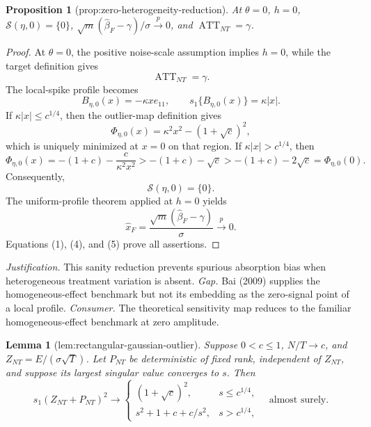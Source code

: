 \documentclass{article}
\newtheorem{lemma}{Lemma}
\newtheorem{proposition}{Proposition}
\begin{document}
\begin{proposition}[prop:zero-heterogeneity-reduction]\label{prop:zero-heterogeneity-reduction}
At \(\theta=0\), \(h=0\), \(\mathcal S(\eta,0)=\{0\}\), \(\sqrt m(\widehat\beta_F-\gamma)/\sigma\xrightarrow{p}0\), and \(\operatorname{ATT}_{NT}=\gamma\).
\end{proposition}
\begin{proof}
At \(\theta=0\), the positive noise-scale assumption implies \(h=0\), while the target definition gives
\[
 \operatorname{ATT}_{NT}=\gamma. \tag{1}
\]
The local-spike profile becomes
\[
 B_{\eta,0}(x)=-\kappa xe_{11},
 \qquad s_1\{B_{\eta,0}(x)\}=\kappa|x|. \tag{2}
\]
If \(\kappa|x|\leq c^{1/4}\), then the outlier-map definition gives
\[
 \Phi_{\eta,0}(x)=\kappa^2x^2-(1+\sqrt c)^2,
\]
which is uniquely minimized at \(x=0\) on that region.  If \(\kappa|x|>c^{1/4}\), then
\[
 \Phi_{\eta,0}(x)=-(1+c)-\frac{c}{\kappa^2x^2}
 >-(1+c)-\sqrt c
 >-(1+c)-2\sqrt c=\Phi_{\eta,0}(0). \tag{3}
\]
Consequently,
\[
 \mathcal S(\eta,0)=\{0\}. \tag{4}
\]
The uniform-profile theorem applied at \(h=0\) yields
\[
 \widehat x_F=\frac{\sqrt m(\widehat\beta_F-\gamma)}\sigma\xrightarrow{p}0. \tag{5}
\]
Equations (1), (4), and (5) prove all assertions.
\end{proof}
\par\smallskip\noindent \textit{Justification.} This sanity reduction prevents spurious absorption bias when heterogeneous treatment variation is absent. \textit{Gap.} Bai (2009) supplies the homogeneous-effect benchmark but not its embedding as the zero-signal point of a local profile. \textit{Consumer.} The theoretical sensitivity map reduces to the familiar homogeneous-effect benchmark at zero amplitude.

\begin{lemma}[lem:rectangular-gaussian-outlier]\label{lem:rectangular-gaussian-outlier}
Suppose \(0<c\leq 1\), \(N/T\to c\), and \(Z_{NT}=E/(\sigma\sqrt T)\).  Let \(P_{NT}\) be deterministic of fixed rank, independent of \(Z_{NT}\), and suppose its largest singular value converges to \(s\).  Then
\[
s_1(Z_{NT}+P_{NT})^2\longrightarrow
\begin{cases}
(1+\sqrt c)^2,&s\leq c^{1/4},\\
s^2+1+c+c/s^2,&s>c^{1/4},
\end{cases}
\quad\text{almost surely}.
\]
\end{lemma}
\end{document}
